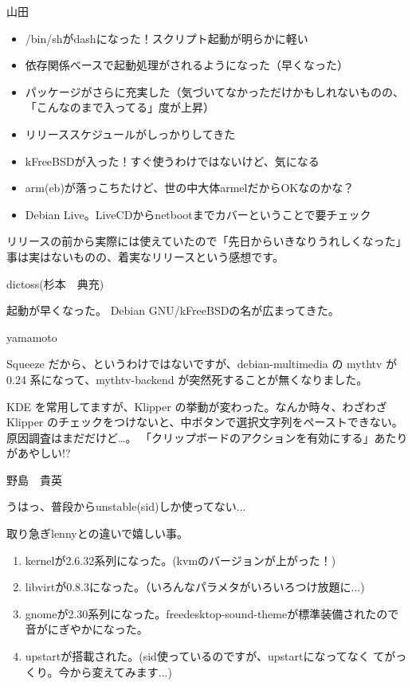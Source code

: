 \begin{prework}{ 山田 }

\begin{itemize}
 \item /bin/shがdashになった！スクリプト起動が明らかに軽い
 \item 依存関係ベースで起動処理がされるようになった（早くなった）
 \item パッケージがさらに充実した（気づいてなかっただけかもしれないものの、「こんなのまで入ってる」度が上昇）
 \item リリーススケジュールがしっかりしてきた
\end{itemize}

\begin{itemize}
 \item kFreeBSDが入った！すぐ使うわけではないけど、気になる
 \item arm(eb)が落っこちたけど、世の中大体armelだからOKなのかな？
 \item Debian Live。LiveCDからnetbootまでカバーということで要チェック
\end{itemize}
リリースの前から実際には使えていたので「先日からいきなりうれしくなった」事は実はないものの、着実なリリースという感想です。
\end{prework}

\begin{prework}{ dictoss(杉本　典充) }

起動が早くなった。
Debian GNU/kFreeBSDの名が広まってきた。
\end{prework}

\begin{prework}{ yamamoto }

Squeeze だから、というわけではないですが、debian-multimedia の mythtv が
 0.24 系になって、mythtv-backend が突然死することが無くなりました。

KDE を常用してますが、Klipper の挙動が変わった。なんか時々、わざわざ Klipper のチェックをつけないと、中ボタンで選択文字列をペーストできない。
原因調査はまだだけど…。
「クリップボードのアクションを有効にする」あたりがあやしい!?
\end{prework}

\begin{prework}{ 野島　貴英 }

うはっ、普段からunstable(sid)しか使ってない...

取り急ぎlennyとの違いで嬉しい事。
\begin{enumerate}
 \item kernelが2.6.32系列になった。(kvmのバージョンが上がった！)
 \item libvirtが0.8.3になった。（いろんなパラメタがいろいろつけ放題に...)
 \item gnomeが2.30系列になった。freedesktop-sound-themeが標準装備されたので音がにぎやかになった。
 \item upstartが搭載された。(sid使っているのですが、upstartになってなく
       てがっくり。今から変えてみます...)
\end{enumerate}
\end{prework}

